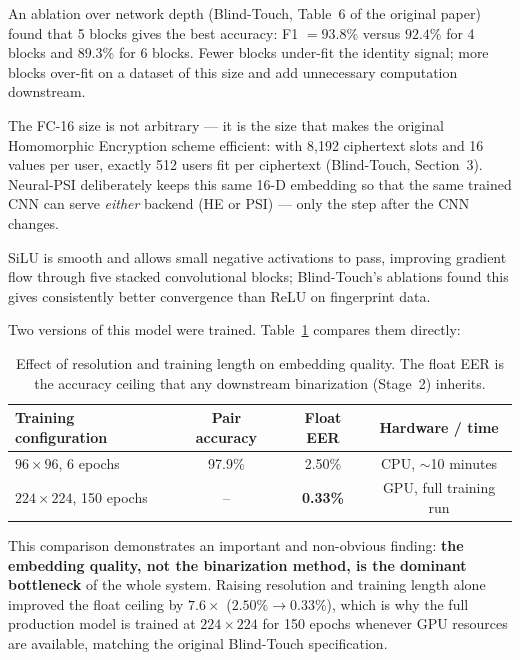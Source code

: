 \documentclass[11pt]{article}
\begin{document}
\begin{description}[leftmargin=1.2em, style=nextline]
\item[Five convolutional blocks.] An ablation over network depth (Blind-Touch, Table~6 of
the original paper) found that 5 blocks gives the best accuracy: F1
$=93.8\%$ versus $92.4\%$ for 4 blocks and $89.3\%$ for 6 blocks. Fewer blocks under-fit the
identity signal; more blocks over-fit on a dataset of this size and add unnecessary
computation downstream.

\item[16-dimensional output.] The FC-16 size is not arbitrary --- it is the size that makes
the original Homomorphic Encryption scheme efficient: with 8{,}192 ciphertext slots and 16
values per user, exactly 512 users fit per ciphertext (Blind-Touch, Section~3). Neural-PSI
deliberately keeps this same 16-D embedding so that the same trained CNN can serve
\emph{either} backend (HE or PSI) --- only the step after the CNN changes.

\item[SiLU over ReLU.] SiLU is smooth and allows small negative activations to pass,
improving gradient flow through five stacked convolutional blocks; Blind-Touch's ablations
found this gives consistently better convergence than ReLU on fingerprint data.

\item[CPU-trained (96$\times$96, 6 epochs) versus GPU-trained (224$\times$224, 150
epochs).] Two versions of this model were trained. Table~\ref{tab:cnn-compare} compares
them directly:

\begin{table}[h]
\centering
\begin{tabular}{lccc}
\toprule
Training configuration & Pair accuracy & Float EER & Hardware / time \\
\midrule
$96\times96$, 6 epochs   & 97.9\% & 2.50\% & CPU, $\sim$10 minutes \\
$224\times224$, 150 epochs & --   & \textbf{0.33\%} & GPU, full training run \\
\bottomrule
\end{tabular}
\caption{Effect of resolution and training length on embedding quality. The float EER is
the accuracy ceiling that any downstream binarization (Stage~2) inherits.}
\label{tab:cnn-compare}
\end{table}

This comparison demonstrates an important and non-obvious finding: \textbf{the embedding
quality, not the binarization method, is the dominant bottleneck} of the whole system. Raising
resolution and training length alone improved the float ceiling by $7.6\times$ ($2.50\% \to
0.33\%$), which is why the full production model is trained at $224\times224$ for 150
epochs whenever GPU resources are available, matching the original Blind-Touch
specification.
\end{description}
\end{document}
